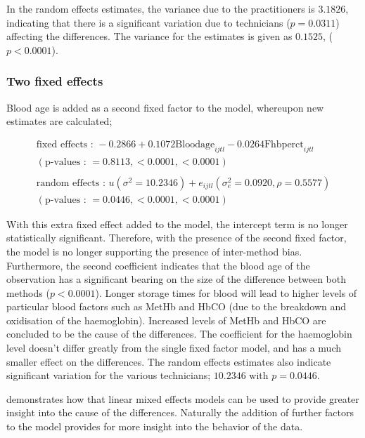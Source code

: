\documentclass[12pt, a4paper]{report}
\theoremstyle{plain}
\theoremstyle{definition}
\theoremstyle{remark}
\begin{document}
In the random effects estimates, the variance due to the
practitioners is $3.1826$, indicating that there is a significant
variation due to technicians ($p=0.0311$) affecting the
differences. The variance for the estimates is given as $0.1525$,
($p<0.0001$).

\subsubsection{Two fixed effects}
Blood age is added as a second fixed factor to the model,
whereupon new estimates are calculated;
\begin{framed}
	\begin{eqnarray}
	\mbox{fixed effects :   } -0.2866 + 0.1072 \mbox{Bloodage}_{ijtl}
	- 0.0264\mbox{Fhbperct}_{ijtl}\nonumber\\
	( \mbox{p-values :   } = 0.8113, <0.0001, <0.0001)\nonumber\\\nonumber\\
	\mbox{random effects :   } u(\sigma^{2}=10.2346) + e_{ijtl}
	(\sigma^{2}_{e}=0.0920, \rho= 0.5577) \nonumber\\
	(\mbox{p-values :   } = 0.0446, <0.0001, <0.0001)
	\end{eqnarray}
\end{framed}


With this extra fixed effect added to the model, the intercept
term is no longer statistically significant. Therefore, with the
presence of the second fixed factor, the model is no longer
supporting the presence of inter-method bias. Furthermore, the
second coefficient indicates that the blood age of the observation
has a significant bearing on the size of the difference between
both methods ($p <0.0001$). Longer storage times for blood will
lead to higher levels of particular blood factors such as MetHb
and HbCO (due to the breakdown and oxidisation of the
haemoglobin). Increased levels of MetHb and HbCO are concluded to
be the cause of the differences. The coefficient for the
haemoglobin level doesn't differ greatly from the single fixed
factor model, and has a much smaller effect on the differences.
The random effects estimates also indicate significant variation
for the various technicians; $10.2346$ with $p=0.0446$.

\citet{LaiShiao} demonstrates how that linear mixed effects models
can be used to provide greater insight into the cause of the
differences. Naturally the addition of further factors to the
model provides for more insight into the behavior of the data.
\end{document}
